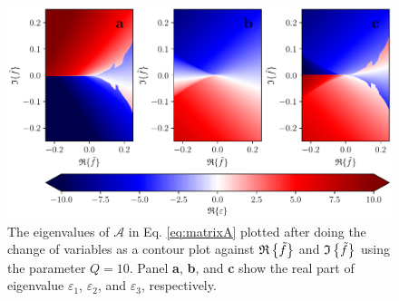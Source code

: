 \begin{figure}
    \centering
    \includegraphics[width=\textwidth]{figures/eigenvaluesSecondMomenta.pdf}
    \caption{The eigenvalues of $\mathcal{A}$ in Eq. \eqref{eq:matrixA} plotted after doing the change of variables as a contour plot against $\mathfrak{R}\left\{\tilde{f}\right\}$ and $\mathfrak{I}\left\{\tilde{f}\right\}$ using the parameter $Q=10$. Panel \textbf{a}, \textbf{b}, and \textbf{c} show the real part of eigenvalue $\varepsilon_1$, $\varepsilon_2$, and $\varepsilon_3$, respectively.}
    \label{fig:eigenvalueSecondMomenta}
\end{figure}

